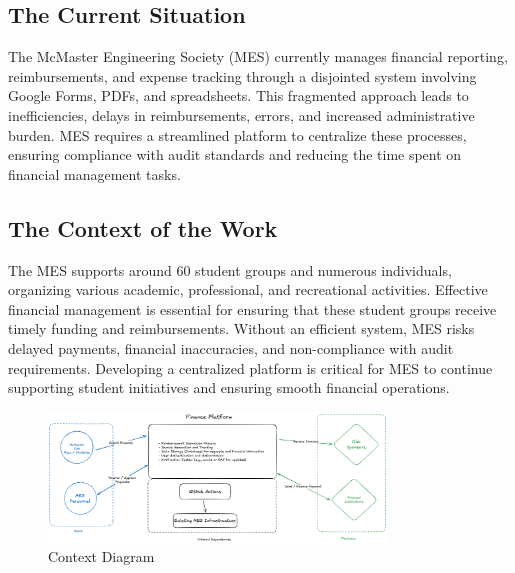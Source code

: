 \documentclass[12pt]{article}
\begin{document}
\subsection{The Current Situation}
The McMaster Engineering Society (MES) currently manages financial reporting, reimbursements, and expense tracking through a disjointed system involving Google Forms, PDFs, and spreadsheets. This fragmented approach leads to inefficiencies, delays in reimbursements, errors, and increased administrative burden. MES requires a streamlined platform to centralize these processes, ensuring compliance with audit standards and reducing the time spent on financial management tasks.

\subsection{The Context of the Work}
The MES supports around 60 student groups and numerous individuals, organizing various academic, professional, and recreational activities. Effective financial management is essential for ensuring that these student groups receive timely funding and reimbursements. Without an efficient system, MES risks delayed payments, financial inaccuracies, and non-compliance with audit requirements. Developing a centralized platform is critical for MES to continue supporting student initiatives and ensuring smooth financial operations.

\begin{figure}[h!]
    \centering
    \includegraphics[width=0.8\textwidth]{./imgs/context-diagram.png}
    \caption{Context Diagram}
\end{figure}
\end{document}
